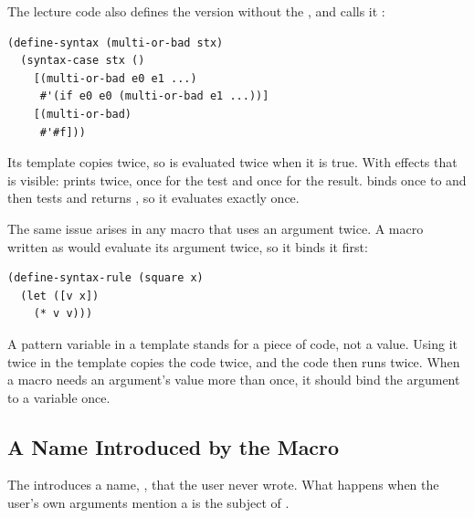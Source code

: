 The lecture code also defines the version without the , and calls it :
\begin{lstlisting}
(define-syntax (multi-or-bad stx)
  (syntax-case stx ()
    [(multi-or-bad e0 e1 ...)
     #'(if e0 e0 (multi-or-bad e1 ...))]
    [(multi-or-bad)
     #'#f]))
\end{lstlisting}
Its template copies  twice, so  is evaluated twice when it is true. With effects that is visible:  prints  twice, once for the test and once for the result.  binds  once to  and then tests and returns , so it evaluates  exactly once.

The same issue arises in any macro that uses an argument twice. A  macro written as  would evaluate its argument twice, so it binds it first:
\begin{lstlisting}
(define-syntax-rule (square x)
  (let ([v x])
    (* v v)))
\end{lstlisting}

\begin{keypoint}
A pattern variable in a template stands for a piece of code, not a value. Using it twice in the template copies the code twice, and the code then runs twice. When a macro needs an argument's value more than once, it should bind the argument to a variable once.
\end{keypoint}

\subsection{A Name Introduced by the Macro}

The  introduces a name, , that the user never wrote. What happens when the user's own arguments mention a  is the subject of .
